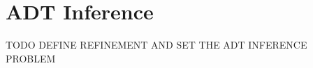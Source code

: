 \section{ADT Inference}
\label{sec:inference}

TODO DEFINE REFINEMENT AND SET THE ADT INFERENCE PROBLEM
